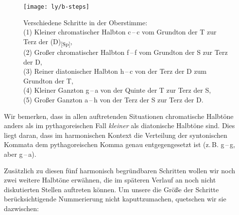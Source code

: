 \begin{figure}
  \centering
  \texttt{[image: ly/b-steps]}
  \caption{Verschiedene Schritte in der Oberstimme:\\
    \hspace*{3mm}(1) Kleiner chromatischer  Halbton c\,–\,\sharpmm c
    vom Grundton der T zur Terz der (D)\textsubscript{[Sp]},\\
    \hspace*{3mm}(2) Großer chromatischer Halbton f\,–\,\sharpm f
    vom Grundton  der S zur Terz der \raisebox{1px}{D}\hspace*{-4.5px}D,\\
    \hspace*{3mm}(3) Reiner diatonischer Halbton \naturalm h\,–\,c
    von der Terz der D zum Grundton der T,\\
    \hspace*{3mm}(4) Kleiner Ganzton g\,–\,\naturalm a
    von der Quinte der T zur Terz der S,\\
    \hspace*{3mm}(5) Großer Ganzton \naturalm a\,–\,\naturalm h
    von der Terz der S zur Terz der D.}\label{fig:steps}
\end{figure}

\noindent Wir bemerken, dass in allen auftretenden Situationen chromatische
Halbtöne anders als im pythagoreischen Fall \emph{kleiner} als diatonische
Halbtöne sind.  Dies liegt daran, dass im harmonischen Kontext die Verteilung
der syntonischen Kommata dem pythagoreischen Komma genau entgegengesetzt ist
(z.\,B. g\,–\,\sharpm g, aber g\,–\,\flatp a).

Zusätzlich zu diesen fünf harmonisch begründbaren Schritten wollen wir noch zwei
weitere Halbtöne erwähnen, die im späteren Verlauf an noch nicht
diskutierten Stellen auftreten können. Um unsere die Größe der Schritte
berücksichtigende Nummerierung nicht kaputtzumachen, quetschen wir sie dazwischen:

